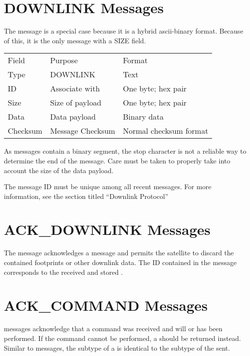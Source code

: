 \documentclass{article}
\begin{document}
\section{DOWNLINK Messages}
  The \mdownlink message is a special case because it is a hybrid ascii-binary 
  format. Because of this, it is the only message with a SIZE field.
  
  \begin{center}
  \begin{tabular}{| l | l | l |}
   \hline
  	Field & Purpose & Format \\
  	Type & DOWNLINK & Text \\
  	ID & Associate \mdownlink with \madownlink & One byte; hex pair \\
  	Size & Size of payload & One byte; hex pair \\
  	Data & Data payload & Binary data \\
  	Checksum & Message Checksum & Normal checksum format \\
   \hline
  \end{tabular}
  \end{center}
  	
  As \mdownlink messages contain a binary segment, the stop character is not
  a reliable way to determine the end of the message. Care must be taken to 
  properly take into account the size of the data payload.
 
  The message ID must be unique among all recent messages. For more
  information, see the section titled ``Downlink Protocol''
  
\section{ACK\_DOWNLINK Messages}
	The \madownlink message acknowledges a \mdownlink message and permits the
	satellite to discard the contained footprints or other downlink data. The 
	ID contained in the \madownlink message corresponds to the received and
	stored \mdownlink.
	
\section{ACK\_COMMAND Messages}
  \macommand messages acknowledge that a command was received and will or has been performed. If
  the command cannot be performed, a \merror should be returned instead. Similar to \mresult messages,
  the subtype of a \macommand is identical to the subtype of the \mcommand sent.
  
\end{document}
